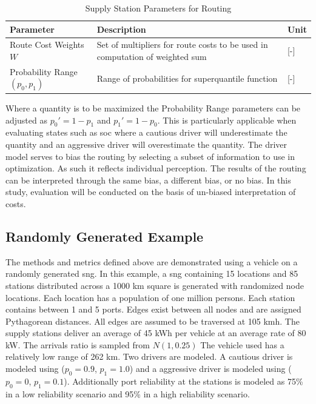 \documentclass[11pt]{article}
\begin{document}
\begin{multicols}{2}
\begin{table}[H]
	\centering
	\caption{Supply Station Parameters for Routing}
	\label{tab:param_driver}
	\begin{tabular}{|C{/8}|C{/8}|C{/8}|}
		\hline Parameter & Description & Unit \\
		\hline Route Cost Weights $W$ & Set of multipliers for route costs to be used in computation of weighted sum & [-] \\
		\hline Probability Range $(p_0, p_1)$ & Range of probabilities for superquantile function & [-] \\
		\hline
	\end{tabular}
\end{table}

Where a quantity is to be maximized the Probability Range parameters can be adjusted as $p_0' = 1 - p_1$ and $p_1' = 1 - p_0$. This is particularly applicable when evaluating states such as \gls{soc} where a cautious driver will underestimate the quantity and an aggressive driver will overestimate the quantity. The driver model serves to bias the routing by selecting a subset of information to use in optimization. As such it reflects individual perception. The results of the routing can be interpreted through the same bias, a different bias, or no bias. In this study, evaluation will be conducted on the basis of un-biased interpretation of costs.

\subsection*{Randomly Generated Example}

The methods and metrics defined above are demonstrated using a vehicle on a randomly generated \gls{sng}. In this example, a \gls{sng} containing 15 locations and 85 stations distributed across a 1000 km square is generated with randomized node locations. Each location has a population of one million persons. Each station contains between 1 and 5 ports. Edges exist between all nodes and are assigned Pythagorean distances. All edges are assumed to be traversed at 105 kmh. The supply stations deliver an average of 45 kWh per vehicle at an average rate of 80 kW. The arrivals ratio is sampled from $N(1, 0.25)$ The vehicle used has a relatively low range of 262 km. Two drivers are modeled. A cautious driver is modeled using ($p_0 = 0.9$, $p_1 = 1.0$) and a aggressive driver is modeled using ($p_0 = 0$, $p_1 = 0.1$). Additionally port reliability at the stations is modeled as 75\% in a low reliability scenario and 95\% in a high reliability scenario.


\end{multicols}
\end{document}

